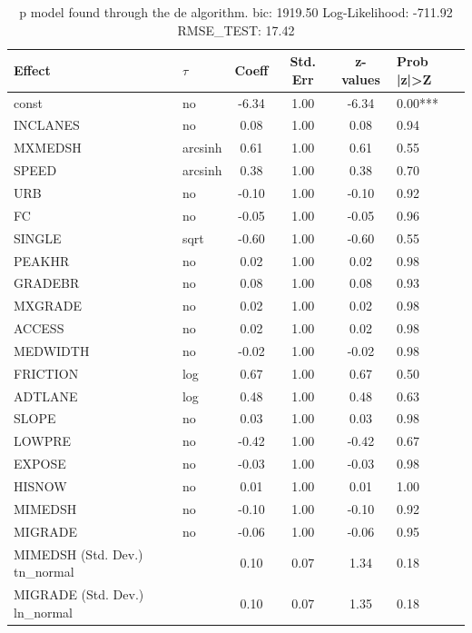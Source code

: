 \begin{table}
	\caption{p model found through the de algorithm. bic: 1919.50 Log-Likelihood: -711.92 RMSE_TEST: 17.42}
	\begin{center}
		\begin{tabular}{|l|l|c|c|c|l|}
			\hline
			Effect & $\tau$ & Coeff & Std. Err & z-values & Prob |z|>Z \\
			\hline
			const & no & -6.34 & 1.00 & -6.34 & 0.00*** \\
			\hline
			INCLANES & no & 0.08 & 1.00 & 0.08 & 0.94 \\
			\hline
			MXMEDSH & arcsinh & 0.61 & 1.00 & 0.61 & 0.55 \\
			\hline
			SPEED & arcsinh & 0.38 & 1.00 & 0.38 & 0.70 \\
			\hline
			URB & no & -0.10 & 1.00 & -0.10 & 0.92 \\
			\hline
			FC & no & -0.05 & 1.00 & -0.05 & 0.96 \\
			\hline
			SINGLE & sqrt & -0.60 & 1.00 & -0.60 & 0.55 \\
			\hline
			PEAKHR & no & 0.02 & 1.00 & 0.02 & 0.98 \\
			\hline
			GRADEBR & no & 0.08 & 1.00 & 0.08 & 0.93 \\
			\hline
			MXGRADE & no & 0.02 & 1.00 & 0.02 & 0.98 \\
			\hline
			ACCESS & no & 0.02 & 1.00 & 0.02 & 0.98 \\
			\hline
			MEDWIDTH & no & -0.02 & 1.00 & -0.02 & 0.98 \\
			\hline
			FRICTION & log & 0.67 & 1.00 & 0.67 & 0.50 \\
			\hline
			ADTLANE & log & 0.48 & 1.00 & 0.48 & 0.63 \\
			\hline
			SLOPE & no & 0.03 & 1.00 & 0.03 & 0.98 \\
			\hline
			LOWPRE & no & -0.42 & 1.00 & -0.42 & 0.67 \\
			\hline
			EXPOSE & no & -0.03 & 1.00 & -0.03 & 0.98 \\
			\hline
			HISNOW & no & 0.01 & 1.00 & 0.01 & 1.00 \\
			\hline
			MIMEDSH & no & -0.10 & 1.00 & -0.10 & 0.92 \\
			\hline
			MIGRADE & no & -0.06 & 1.00 & -0.06 & 0.95 \\
			\hline
			MIMEDSH (Std. Dev.) tn_normal &  & 0.10 & 0.07 & 1.34 & 0.18 \\
			\hline
			MIGRADE (Std. Dev.) ln_normal &  & 0.10 & 0.07 & 1.35 & 0.18 \\
			\hline
		\end{tabular}
	\end{center}
\end{table}
